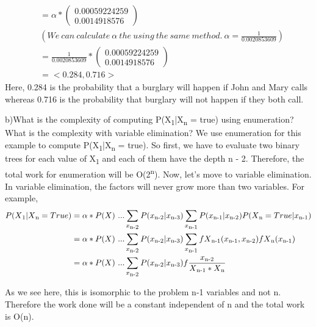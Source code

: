 \documentclass[12pt]{article}
\newenvironment{problem}[2][Problem]{\begin{trivlist}
\item[\hskip \labelsep {\bfseries #1}\hskip \labelsep {\bfseries #2.}]}{\end{trivlist}}
\begin{document}
\begin{problem}{2}
\begin{align*}
        & = \alpha * \left( \begin{array}{c} 0.00059224259 \\ 0.0014918576 \end{array} \right)\\
        & ( We \ can \ calculate \ \alpha  \ the \ using \ the \ same \ method. \ \alpha = \frac{1}{0.0020853609})\\ 
        & = \frac{1}{0.0020853609} * \left( \begin{array}{c} 0.00059224259 \\ 0.0014918576 \end{array} \right) \\
        & = <0.284,0.716>
    \end{align*} 
   Here, 0.284 is the probability that a burglary will happen if John and Mary calls whereas 0.716 is the probability that burglary will not happen if they both call. 
   \newpage

    b)What is the complexity of computing P(X\textsubscript{1}|X\textsubscript{n} = true) using enumeration? What is the complexity with variable elimination?
    \newline
    \newline
    We use enumeration for this example to compute P(X\textsubscript{1}|X\textsubscript{n} = true). So first, we have to evaluate two binary trees for each value of X\textsubscript{1} and each of them have the depth n - 2. Therefore, the total work for enumeration will be O(2\textsuperscript{n}).
    \newline
    \newline
    Now, let's move to variable elimination. In variable elimination, the factors will never grow more than two variables. For example, \newline
    \begin{align*}
    P(X\textsubscript{1} | X\textsubscript{n} = True) 
    & = \alpha * P(X)  \ ...\sum_{x\textsubscript{n-2}} P(x\textsubscript{n-2} | x\textsubscript{n-3}) \sum_{x\textsubscript{n-1}} P(x\textsubscript{n-1} | x\textsubscript{n-2}) P(X\textsubscript{n} = True | x\textsubscript{n-1})\\
    & = \alpha * P(X) \ ... \sum_{x\textsubscript{n-2}} P(x\textsubscript{n-2} | x\textsubscript{n-3}) \sum_{x\textsubscript{n-1}} f X\textsubscript{n-1}(x\textsubscript{n-1},x\textsubscript{n-2}) f X\textsubscript{n}(x\textsubscript{n-1})\\
    & = \alpha * P(X) \ ... \sum_{x\textsubscript{n-2}}P(x\textsubscript{n-2} | x\textsubscript{n-3}) f \frac{x\textsubscript{n-2}}{X\textsubscript{n-1}* X\textsubscript{n}}
    \end{align*}
    
    As we see here, this is isomorphic to the problem n-1 variables and not n. Therefore the work done will be a constant independent of n and the total work is O(n).
  

    
    

\end{problem}
\end{document}
